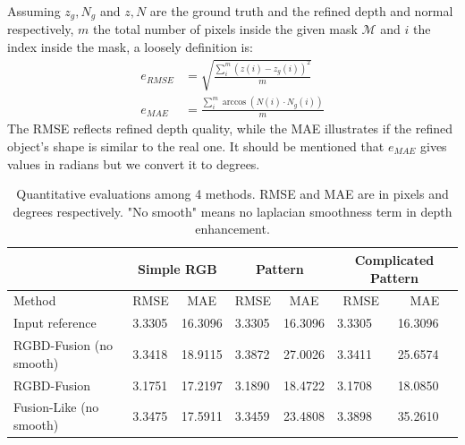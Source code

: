 Assuming $z_g, N_g$ and $z, N$ are the ground truth and the refined depth and normal respectively, $m$ the total number of pixels inside the given mask $\mathcal{M}$ and $i$ the index inside the mask, a loosely definition is: 
\begin{align}
    e_{RMSE} &= \sqrt{\frac{\sum\limits_{i}^{m}{(z(i) - z_g(i))^2}}{m}}\\
    e_{MAE} &= \frac{\sum\limits_{i}^{m} \arccos (N(i) \cdot N_g(i))}{m}
\end{align}
The RMSE reflects refined depth quality, while the MAE illustrates if the refined object's shape is similar to the real one. 
It should be mentioned that $e_{MAE}$ gives values in radians but we convert it to degrees.

\begin{table}[!ht]
\caption{Quantitative evaluations among 4 methods. RMSE and MAE are in pixels and degrees respectively. "No smooth" means no laplacian smoothness term in depth enhancement.}
\vspace{1em}
\label{tab:comp_syn_eval}
\centering
\begin{tabular}{lllllll}
                                       & \multicolumn{2}{c}{Simple RGB}                     & \multicolumn{2}{c}{Pattern}                        & \multicolumn{2}{c}{Complicated Pattern}            \\\hline
Method                                 & \multicolumn{1}{c}{RMSE} & \multicolumn{1}{c}{MAE} & \multicolumn{1}{c}{RMSE} & \multicolumn{1}{c}{MAE} & \multicolumn{1}{c}{RMSE} & \multicolumn{1}{c}{MAE} \\\hline\hline
Input reference                              & 3.3305                   & 16.3096                 & 3.3305                   & 16.3096                 & 3.3305                   & 16.3096                 \\
RGBD-Fusion\cite{or2015rgbd} (no smooth)                       & 3.3418                   & 18.9115                 & 3.3872                   & 27.0026                 & 3.3411                   & 25.6574  		\\
RGBD-Fusion\cite{or2015rgbd} & 3.1751                   & 17.2197                 & 3.1890                   & 18.4722                 & 3.1708                   & 18.0850                 \\ 
Fusion-Like (no smooth)                  & 3.3475                   & 17.5911                 & 3.3459                   & 23.4808                 & 3.3898                   & 35.2610                 \\

\end{tabular}
\end{table}

